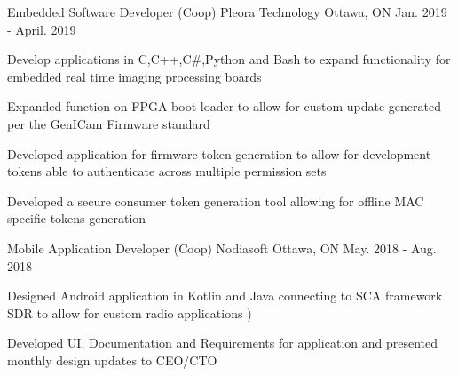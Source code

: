 \begin{cventries}
  \cventry
    {Embedded Software Developer (Coop)} %
    {Pleora Technology} %
    {Ottawa, ON} %
    {Jan. 2019 - April. 2019} %
    {
      \begin{cvitems} %
      \item { Develop applications in C,C++,C\#,Python and Bash  to expand functionality for embedded real time imaging processing boards} 
      \item { Expanded function on FPGA boot loader to allow for custom update  generated per the GenICam Firmware standard }
      \item { Developed application for firmware token generation to allow for development tokens able to authenticate across multiple permission sets }
      \item { Developed a secure consumer token generation tool allowing for offline MAC specific tokens generation}
      \end{cvitems}
    }

  \cventry
    {Mobile Application Developer (Coop)} %
    {Nodiasoft } %
    {Ottawa, ON} %
    {May. 2018 - Aug. 2018} %
    {
      \begin{cvitems} %
        \item {Designed Android application in Kotlin and Java connecting to SCA framework SDR to allow for custom radio applications )}
        \item { Developed UI, Documentation and Requirements for application and presented monthly design updates to CEO/CTO }
      \end{cvitems}
    }


\end{cventries}
